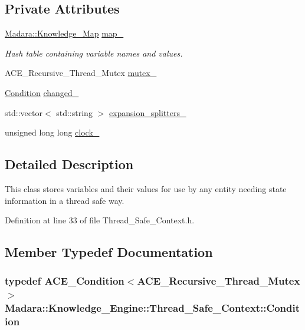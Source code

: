 \subsection*{Private Attributes}
\begin{DoxyCompactItemize}
\item 
\hyperlink{namespaceMadara_a072a1733d5e97cad8e1564c37135a506}{Madara::Knowledge\_\-Map} \hyperlink{classMadara_1_1Knowledge__Engine_1_1Thread__Safe__Context_ab440ae2c260b9592a3bc899c3f9a2607}{map\_\-}
\begin{DoxyCompactList}\small\item\em Hash table containing variable names and values. \item\end{DoxyCompactList}\item 
ACE\_\-Recursive\_\-Thread\_\-Mutex \hyperlink{classMadara_1_1Knowledge__Engine_1_1Thread__Safe__Context_a239fefcb443bba3eddef39342ca6a110}{mutex\_\-}
\item 
\hyperlink{classMadara_1_1Knowledge__Engine_1_1Thread__Safe__Context_adad1b4f13e2506ea29d19c6ae0703f8e}{Condition} \hyperlink{classMadara_1_1Knowledge__Engine_1_1Thread__Safe__Context_ae5f55e8a134860c3e71fb4bbef3d5418}{changed\_\-}
\item 
std::vector$<$ std::string $>$ \hyperlink{classMadara_1_1Knowledge__Engine_1_1Thread__Safe__Context_ac98bb47361f4d859e8306de5d92ca0eb}{expansion\_\-splitters\_\-}
\item 
unsigned long long \hyperlink{classMadara_1_1Knowledge__Engine_1_1Thread__Safe__Context_ae16c3d6186939bca49989c8c31262861}{clock\_\-}
\end{DoxyCompactItemize}


\subsection{Detailed Description}
This class stores variables and their values for use by any entity needing state information in a thread safe way. 

Definition at line 33 of file Thread\_\-Safe\_\-Context.h.



\subsection{Member Typedef Documentation}
\hypertarget{classMadara_1_1Knowledge__Engine_1_1Thread__Safe__Context_adad1b4f13e2506ea29d19c6ae0703f8e}{
\subsubsection[{Condition}]{\setlength{\rightskip}{0pt plus 5cm}typedef ACE\_\-Condition$<$ACE\_\-Recursive\_\-Thread\_\-Mutex$>$ {\bf Madara::Knowledge\_\-Engine::Thread\_\-Safe\_\-Context::Condition}}}
\label{d4/da3/classMadara_1_1Knowledge__Engine_1_1Thread__Safe__Context_adad1b4f13e2506ea29d19c6ae0703f8e}



